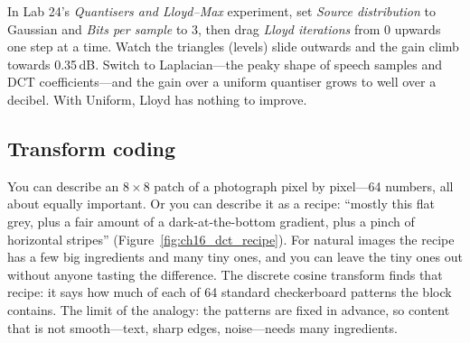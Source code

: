 
\begin{tryit}
In Lab 24's \emph{Quantisers and Lloyd--Max} experiment, set \emph{Source distribution} to
Gaussian and \emph{Bits per sample} to 3, then drag \emph{Lloyd iterations} from 0 upwards one
step at a time. Watch the triangles (levels) slide outwards and the gain climb towards 0.35\,dB.
Switch to Laplacian---the peaky shape of speech samples and DCT coefficients---and the gain over a
uniform quantiser grows to well over a decibel. With Uniform, Lloyd has nothing to improve.
\end{tryit}

\subsection{Transform coding}

\begin{analogy}
You can describe an $8\times8$ patch of a photograph pixel by pixel---64 numbers, all about equally
important. Or you can describe it as a recipe: ``mostly this flat grey, plus a fair amount of a
dark-at-the-bottom gradient, plus a pinch of horizontal stripes'' (Figure~\ref{fig:ch16_dct_recipe}).
For natural images the recipe has a few big ingredients and many tiny ones, and you can leave the
tiny ones out without anyone tasting the difference. The discrete cosine transform finds that
recipe: it says how much of each of 64 standard checkerboard patterns the block contains. The
limit of the analogy: the patterns are fixed in advance, so content that is not smooth---text,
sharp edges, noise---needs many ingredients.
\end{analogy}


